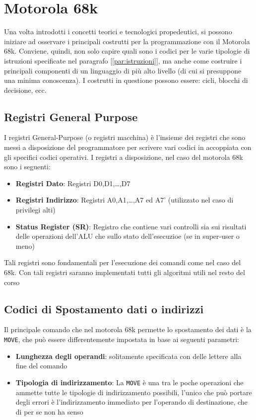\section{Motorola 68k}
Una volta introdotti i concetti teorici e tecnologici propedeutici, si possono iniziare ad osservare i principali costrutti per la programmazione con il Motorola 68k.
Conviene, quindi, non solo capire quali sono i  codici per le varie tipologie di istruzioni specificate nel paragrafo [\ref{par:istruzioni}], ma anche come costruire i principali componenti di un linguaggio di più alto livello (di cui si presuppone una minima conoscenza). I costrutti in questione possono essere: cicli, blocchi di decisione, ecc.

\subsection{Registri General Purpose}
I registri General-Purpose (o registri macchina) è l'insieme dei registri che sono messi a disposizione del programmatore per scrivere vari codici in accoppiata con gli specifici codici operativi.
I registri a disposizione, nel caso del motorola 68k sono i seguenti:
\begin{itemize}
    \item \textbf{Registri Dato}: Registri D0,D1,\dots,D7
    \item \textbf{Registri Indirizzo}: Registri A0,A1,\dots,A7 ed A7' (utilizzato nel caso di privilegi alti)
    \item \textbf{Status Register (SR)}: Registro che contiene vari controlli sia sui risultati delle operazioni dell'ALU che sullo stato dell'esecuzioe (se in super-user o meno)
\end{itemize}

Tali registri sono fondamentali per l'esecuzione dei comandi come nel caso del 68k. Con tali registri saranno implementati tutti gli algoritmi utili nel resto del corso

\subsection{Codici di Spostamento dati o indirizzi}
Il principale comando che nel motorola 68k permette lo spostamento dei dati è la \lstinline|MOVE|, che può essere differentemente impostata in base ai seguenti parametri:

\begin{itemize}
    \item \textbf{Lunghezza degli operandi}: solitamente specificata con delle lettere alla fine del comando
    \item \textbf{Tipologia di indirizzamento}: La \lstinline|MOVE| è una tra le poche operazioni che ammette tutte le tipologie di indirizzamento possibili, l'unico che può portare degli errori è l'indirizzamento immediato per l'operando di destinazione, che di per se non ha senso
\end{itemize}

